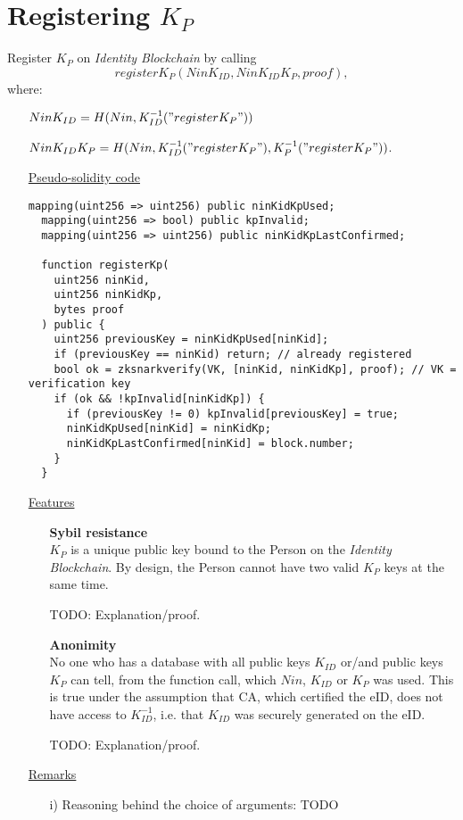 \documentclass{article}
\newcommand{\khk}{K_{P}}
\newcommand{\kid}{K_{ID}}
\newcommand{\pbc}{\textit{Identity Blockchain}}
\begin{document}
\newpage
\section{Registering $\khk$}
Register $\khk$ on \pbc{} by calling $$register\khk(Nin\kid, Nin\kid\khk, proof),$$
  where:
    \begin{enumerate}
      \item[] $Nin\kid=H(Nin,\kid^{-1}("register\khk"))$
      \item[] $Nin\kid\khk=H(Nin, \kid^{-1}("register\khk"), \khk^{-1}("register\khk"))$.
    \end{enumerate}
\begin{enumerate}[leftmargin=0cm]
\item[] \underline{Pseudo-solidity code}

\hfill\begin{minipage}{\dimexpr\textwidth-20px}
\begin{lstlisting}[language=Solidity]
  mapping(uint256 => uint256) public ninKidKpUsed;
  mapping(uint256 => bool) public kpInvalid;
  mapping(uint256 => uint256) public ninKidKpLastConfirmed;

  function registerKp(
    uint256 ninKid,
    uint256 ninKidKp,
    bytes proof
  ) public {
    uint256 previousKey = ninKidKpUsed[ninKid];
    if (previousKey == ninKid) return; // already registered
    bool ok = zksnarkverify(VK, [ninKid, ninKidKp], proof); // VK = verification key
    if (ok && !kpInvalid[ninKidKp]) {
      if (previousKey != 0) kpInvalid[previousKey] = true;
      ninKidKpUsed[ninKid] = ninKidKp;
      ninKidKpLastConfirmed[ninKid] = block.number;
    }
  }
\end{lstlisting}
\xdef\tpd{\the\prevdepth}
\end{minipage}
\item[] \underline{Features}
\begin{itemize}
      \item[] \textbf{Sybil resistance} \\ $\khk$ is a unique public key bound to the Person on the \pbc{}. By design, the Person cannot have two valid $\khk$ keys at the same time.

      TODO: Explanation/proof.
      \vspace{5px}
    \item[] \textbf{Anonimity} \\ No one who has a database with all public keys $\kid$ or/and public keys $\khk$ can tell, from the function call, which $Nin$, $\kid$ or $\khk$ was used. This is true under the assumption that CA, which certified the eID, does not have access to $\kid^{-1}$, i.e. that $\kid$ was securely generated on the eID.

    TODO: Explanation/proof.
\end{itemize}

\item[] \underline{Remarks}
\begin{itemize}
\item[i)] Reasoning behind the choice of arguments: TODO
\end{itemize}


\end{enumerate}
\end{document}
